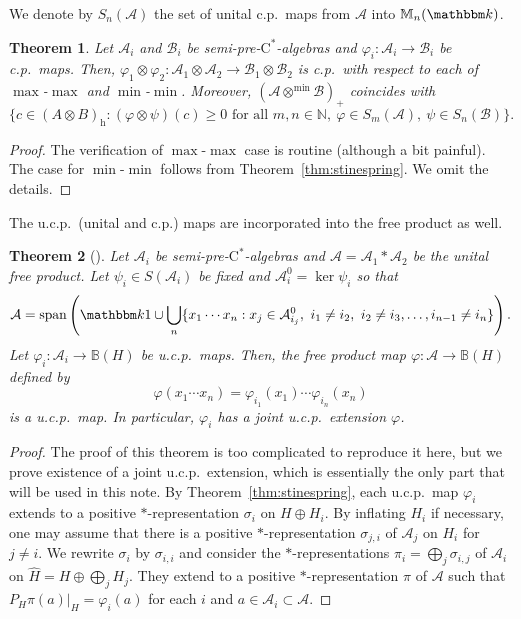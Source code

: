 \documentclass[12pt]{amsart}
\newtheorem{thm}{Theorem}
\theoremstyle{definition}
\begin{document}
We denote by $S_n({{\mathcal A}})$ the set of unital c.p.\ maps from ${{\mathcal A}}$ into ${{\mathbb M}}_n({{\mathbbm k}})$.

\begin{thm}\label{thm:tensorize}
Let ${{\mathcal A}}_i$ and ${{\mathcal B}}_i$ be {semi-pre-$\mathrm{C}^*$-alge\-bra\xspace}{}s and
${\varphi}_i\colon{{\mathcal A}}_i\to{{\mathcal B}}_i$ be c.p.\ maps.
Then, ${\varphi}_1\otimes{\varphi}_2\colon {{\mathcal A}}_1\otimes{{\mathcal A}}_2\to{{\mathcal B}}_1\otimes{{\mathcal B}}_2$
is c.p.\ with respect to each of $\max$-$\max$ and $\min$-$\min$.
Moreover, $({{\mathcal A}}\otimes^{\min}{{\mathcal B}})_+$ coincides with
\[
\{ c\in(A\otimes B)_{\mathrm{h}} :
 ({\varphi}\otimes\psi)(c)\geq0\mbox{ for all }m,n\in{{\mathbb N}},\ {\varphi}\in S_m({{\mathcal A}}),\ \psi\in S_n({{\mathcal B}})\}.
\]
\end{thm}
\begin{proof}
The verification of $\max$-$\max$ case is routine (although a bit painful).
The case for $\min$-$\min$ follows from Theorem~\ref{thm:stinespring}.
We omit the details.
\end{proof}

The u.c.p.\ (unital and c.p.) maps are incorporated into the free product as well.
\begin{thm}[\cite{boca}]\label{thm:boca}
Let ${{\mathcal A}}_i$ be {semi-pre-$\mathrm{C}^*$-alge\-bra\xspace}{}s and
${{\mathcal A}}={{\mathcal A}}_1\ast{{\mathcal A}}_2$ be the unital free product.
Let $\psi_i\in S({{\mathcal A}}_i)$ be fixed and ${{\mathcal A}}_i^{0}=\ker\psi_i$ so that
\[
{{\mathcal A}}=\operatorname*{span}\left({{\mathbbm k}}1\cup\bigcup_n\{ x_1\cdots x_n :
  x_j\in {{\mathcal A}}_{i_j}^{0},\ i_1\neq i_2,\ i_2\neq i_3,\ldots,i_{n-1}\neq i_n\}\right).
\]
Let ${\varphi}_i\colon{{\mathcal A}}_i\to{{\mathbb B}}({H})$ be u.c.p.\ maps.
Then, the free product map ${\varphi}\colon{{\mathcal A}}\to{{\mathbb B}}({H})$ defined by
\[
{\varphi}( x_1\cdots x_n ) = {\varphi}_{i_1}(x_1)\cdots{\varphi}_{i_n}(x_n)
\]
is a u.c.p.\ map. In particular, ${\varphi}_i$ has a joint u.c.p.\ extension ${\varphi}$.
\end{thm}
\begin{proof}
The proof of this theorem is too complicated to reproduce it here, but we prove
existence of a joint u.c.p.\ extension, which is essentially the only part that will be used in this note.
By Theorem~\ref{thm:stinespring}, each u.c.p.\ map ${\varphi}_i$ extends to a positive
{$*$-repre\-sen\-ta\-tion\xspace} $\sigma_i$ on ${H}\oplus{H}_i$. By inflating ${H}_i$ if necessary,
one may assume that there is a positive {$*$-repre\-sen\-ta\-tion\xspace}{} $\sigma_{j,i}$ of ${{\mathcal A}}_j$ on ${H}_i$ for
$j\neq i$. We rewrite $\sigma_i$ by $\sigma_{i,i}$ and consider
the {$*$-repre\-sen\-ta\-tion\xspace}{}s $\pi_i=\bigoplus_j\sigma_{i,j}$ of ${{\mathcal A}}_i$ on
$\hat{H}={H}\oplus\bigoplus_j{H}_j$.
They extend to a positive {$*$-repre\-sen\-ta\-tion\xspace} $\pi$ of ${{\mathcal A}}$ such that
$P_{H}\pi(a)|_{H}={\varphi}_i(a)$ for each $i$ and $a\in{{\mathcal A}}_i\subset{{\mathcal A}}$.
\end{proof}
\end{document}
